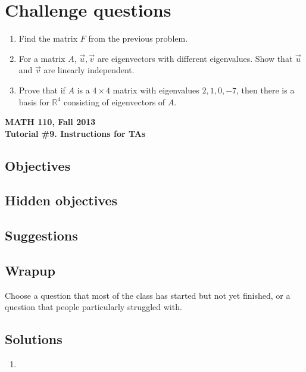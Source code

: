 \documentclass[11pt]{exam}
\newcommand{\R}{\mathbb{R}}
\newcommand{\mthCourse}{MATH 110}
\newcommand{\mthTerm}{Fall 2013}
\newcommand{\mthTutorialNumber}{9}
\begin{document}
\section*{Challenge questions}

\begin{enumerate}[resume]
	\item Find the matrix $F$ from the previous problem.
	\item For a matrix $A$, $\vec u,\vec v$ are eigenvectors with different eigenvalues.
		Show that $\vec u$ and $\vec v$ are linearly independent.
	\item Prove that if $A$ is a $4\times 4$ matrix with eigenvalues $2,1,0,-7$, then
		there is a basis for $\R^4$ consisting of eigenvectors of $A$.

\end{enumerate}



\newpage
{\small
	\begin{center}
		{\bf \mthCourse, \mthTerm}\\ 
		{\bf Tutorial \#\mthTutorialNumber. Instructions for TAs}
	\end{center}
}

\subsection*{Objectives}


\subsection*{Hidden objectives}


\subsection*{Suggestions}

\subsection*{Wrapup}
	Choose a question that most of the class has started but not yet finished,
	or a question that people particularly struggled with.

\subsection*{Solutions}
\begin{enumerate}
	\item
\end{enumerate}
	
\end{document}
